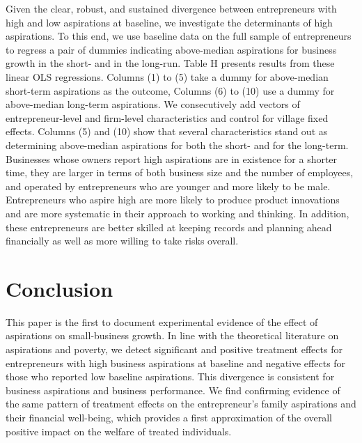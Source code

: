 \documentclass[11.5pt]{article}
\begin{document}
Given the clear, robust, and sustained divergence between entrepreneurs with high and low aspirations at baseline, we investigate the determinants of high aspirations. To this end, we use baseline data on the full sample of entrepreneurs to regress a pair of dummies indicating above-median aspirations for business growth in the short- and in the long-run. Table H presents results from these linear OLS regressions. Columns (1) to (5) take a dummy for above-median short-term aspirations as the outcome, Columns (6) to (10) use a dummy for above-median long-term aspirations. We consecutively add vectors of entrepreneur-level and firm-level characteristics and control for village fixed effects. Columns (5) and (10) show that several characteristics stand out as determining above-median aspirations for both the short- and for the long-term. Businesses whose owners report high aspirations are in existence for a shorter time, they are larger in terms of both business size and the number of employees, and operated by entrepreneurs who are younger and more likely to be male. Entrepreneurs who aspire high are more likely to produce product innovations and are more systematic in their approach to working and thinking. In addition, these entrepreneurs are better skilled at keeping records and planning ahead financially as well as more willing to take risks overall.



\section{Conclusion}\label{sec.conc}

This paper is the first to document experimental evidence of the effect of aspirations on small-business growth. In line with the theoretical literature on aspirations and poverty, we detect significant and positive treatment effects for entrepreneurs with high business aspirations at baseline and negative effects for those who reported low baseline aspirations. This divergence is consistent for business aspirations and business performance. We find confirming evidence of the same pattern of treatment effects on the entrepreneur's family aspirations and their financial well-being, which provides a first approximation of the overall positive impact on the welfare of treated individuals.
\end{document}

